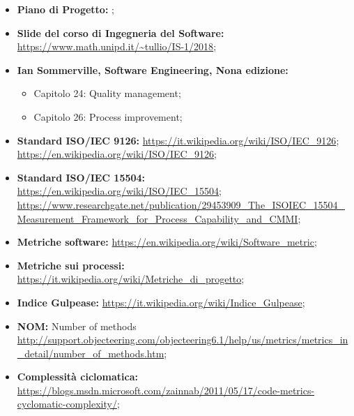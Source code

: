 \begin{itemize}
	\item \textbf{Piano di Progetto:} \PdP;
	\item \textbf{Slide del corso di Ingegneria del Software:}\newline
		  		 \url{https://www.math.unipd.it/~tullio/IS-1/2018};
	\item \textbf{Ian Sommerville, Software Engineering, Nona edizione:}
		\begin{itemize}
		  	\item Capitolo 24: Quality management;
		  	\item Capitolo 26: Process improvement;
		\end{itemize}
	\item \textbf{Standard ISO/IEC 9126:}\newline
		  		  \url{https://it.wikipedia.org/wiki/ISO/IEC_9126};\newline
				  \url{https://en.wikipedia.org/wiki/ISO/IEC_9126};
	\item \textbf{Standard ISO/IEC 15504:}\newline
				  \url{https://en.wikipedia.org/wiki/ISO/IEC_15504};\newline
				  \url{https://www.researchgate.net/publication/29453909_The_ISOIEC_15504_Measurement_Framework_for_Process_Capability_and_CMMI};
	\item \textbf{Metriche software:}\newline
				  \url{https://en.wikipedia.org/wiki/Software_metric};
	\item \textbf{Metriche sui processi:}\newline
				  \url{https://it.wikipedia.org/wiki/Metriche_di_progetto};
	\item \textbf{Indice Gulpease:}\newline
				 \url{https://it.wikipedia.org/wiki/Indice_Gulpease};
	\item \textbf{NOM:} Number of methods\newline
				  \url{http://support.objecteering.com/objecteering6.1/help/us/metrics/metrics_in_detail/number_of_methods.htm};
	\item \textbf{Complessità ciclomatica: }\newline
				 \url{https://blogs.msdn.microsoft.com/zainnab/2011/05/17/code-metrics-cyclomatic-complexity/};
		
\end{itemize}